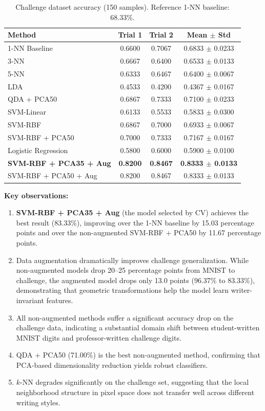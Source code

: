 \documentclass[11pt,a4paper,twocolumn]{article}
\begin{document}
\begin{table}[t]
\centering
\caption{Challenge dataset accuracy (150 samples). Reference 1-NN baseline: 68.33\%.}
\label{tab:challenge-results}
\small
\begin{tabular}{@{}lccc@{}}
\toprule
\textbf{Method} & \textbf{Trial 1} & \textbf{Trial 2} & \textbf{Mean $\pm$ Std} \\
\midrule
1-NN Baseline & 0.6600 & 0.7067 & 0.6833 $\pm$ 0.0233 \\
3-NN & 0.6667 & 0.6400 & 0.6533 $\pm$ 0.0133 \\
5-NN & 0.6333 & 0.6467 & 0.6400 $\pm$ 0.0067 \\
LDA & 0.4533 & 0.4200 & 0.4367 $\pm$ 0.0167 \\
QDA + PCA50 & 0.6867 & 0.7333 & 0.7100 $\pm$ 0.0233 \\
SVM-Linear & 0.6133 & 0.5533 & 0.5833 $\pm$ 0.0300 \\
SVM-RBF & 0.6867 & 0.7000 & 0.6933 $\pm$ 0.0067 \\
SVM-RBF + PCA50 & 0.7000 & 0.7333 & 0.7167 $\pm$ 0.0167 \\
Logistic Regression & 0.5800 & 0.6000 & 0.5900 $\pm$ 0.0100 \\
\textbf{SVM-RBF + PCA35 + Aug} & \textbf{0.8200} & \textbf{0.8467} & \textbf{0.8333 $\pm$ 0.0133} \\
SVM-RBF + PCA50 + Aug & 0.8200 & 0.8467 & 0.8333 $\pm$ 0.0133 \\
\bottomrule
\end{tabular}
\end{table}

\textbf{Key observations:}
\begin{enumerate}[noitemsep]
    \item \textbf{SVM-RBF + PCA35 + Aug} (the model selected by CV) achieves the best result (83.33\%), improving over the 1-NN baseline by 15.03 percentage points and over the non-augmented SVM-RBF + PCA50 by 11.67 percentage points.
    \item Data augmentation dramatically improves challenge generalization. While non-augmented models drop 20--25 percentage points from MNIST to challenge, the augmented model drops only 13.0 points (96.37\% to 83.33\%), demonstrating that geometric transformations help the model learn writer-invariant features.
    \item All non-augmented methods suffer a significant accuracy drop on the challenge data, indicating a substantial domain shift between student-written MNIST digits and professor-written challenge digits.
    \item QDA + PCA50 (71.00\%) is the best non-augmented method, confirming that PCA-based dimensionality reduction yields robust classifiers.
    \item $k$-NN degrades significantly on the challenge set, suggesting that the local neighborhood structure in pixel space does not transfer well across different writing styles.
\end{enumerate}
\end{document}
